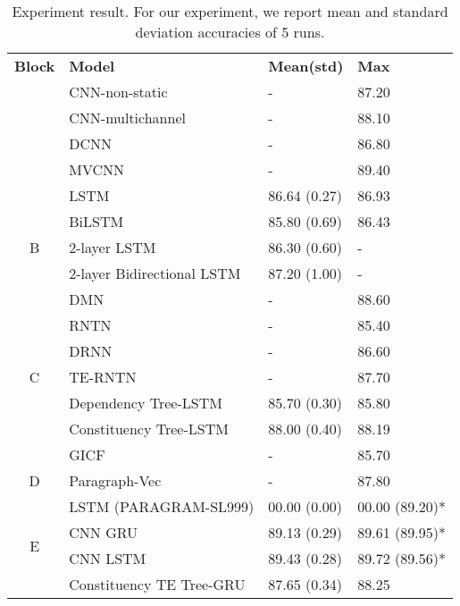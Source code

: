 \begin{table}[H]
	\centering
	\caption{Experiment result. For our experiment, we report mean and standard deviation accuracies of 5 runs.}
	\label{table:experimentresult}
	\begin{tabular}{c|lll}
	\textbf{Block}	& \textbf{Model}  & \textbf{Mean(std)} & \textbf{Max}   \\ 
\Xhline{3\arrayrulewidth}
\Xhline{3\arrayrulewidth}

	\multirow{4}{*}{A} & CNN-non-static \cite{KimCNN} & - & 87.20\Tstrut \\
		& CNN-multichannel \cite{KimCNN} & - & 88.10 \\
	& DCNN \cite{DCNN} & - & 86.80 \\
	& MVCNN \cite{2-layer-cnn} & - & 89.40 \\ 
\hline
		\multirow{5}{*}{B} & LSTM \cite{originLSTM}    & 86.64 (0.27) & 86.93  \\
		& BiLSTM \cite{GravesLSTM}  & 85.80 (0.69) & 86.43   \\ 
		& 2-layer LSTM \cite{GravesLSTM} & 86.30 (0.60) & - \\
 		& 2-layer Bidirectional LSTM \cite{GravesLSTM} & 87.20 (1.00) & - \\
 		& DMN \cite{attention-gru} & - & 88.60 \\
\hline 
		\multirow{5}{*}{C} & RNTN \cite{socher2013recursive}  & - & 85.40  \\
		& DRNN \cite{IrsoyDRNN} & - & 86.60 \\ 
		& TE-RNTN \cite{tag-embedding-rnn} & - & 87.70 \\
		& Dependency Tree-LSTM   \cite{treeLSTM}  & 85.70 (0.30)  & 85.80 \\
 		& Constituency Tree-LSTM  \cite{treeLSTM} & 88.00 (0.40)    &   88.19\\
\hline  
		\multirow{3}{*}{D} & GICF \cite{group-instance} & - & 85.70 \\
 		& Paragraph-Vec \cite{ParagraphVec} & - & 87.80 \\
 		& LSTM (PARAGRAM-SL999) \cite{wieting2015towards} & 00.00 (0.00) & 00.00 (89.20)*
 		 \\
\hline 
 		\multirow{2}{*}{E}  & CNN GRU  \cite{cnn-rnn}					& 89.13 (0.29)  &  89.61 (89.95)*	\\
		 & CNN LSTM  \cite{cnn-rnn}					& 89.43 (0.28)  & 89.72 (89.56)*\Bstrut	\\
\Xhline{3\arrayrulewidth}
\Xhline{3\arrayrulewidth}
		 \multirow{2}{*}{F} & Constituency TE Tree-GRU                 & 87.65 (0.34) & 88.25\Tstrut \\

\end{tabular}
\end{table}
